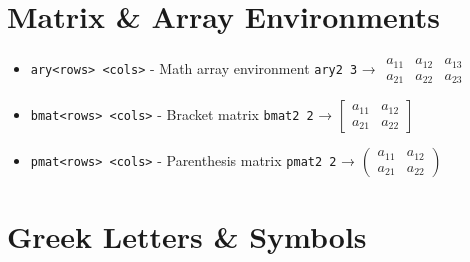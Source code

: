 \documentclass{article}
\newcommand{\snippet}[1]{\textcolor{titlebg}{\texttt{#1}}}
\newcommand{\example}[1]{\colorbox{codebg}{\texttt{#1}}}
\begin{document}
\section{Matrix \& Array Environments}

\begin{tcolorbox}[colback=purple!5!white,colframe=purple!75!black,title=Matrix Generators]
\begin{itemize}[leftmargin=*]
\item \snippet{ary<rows> <cols>} - Math array environment
\example{ary2 3} → 
\(\begin{array}{ccc}
a_{11} & a_{12} & a_{13} \\
a_{21} & a_{22} & a_{23}
\end{array}\)

\item \snippet{bmat<rows> <cols>} - Bracket matrix
\example{bmat2 2} → 
\(\begin{bmatrix}
a_{11} & a_{12} \\
a_{21} & a_{22}
\end{bmatrix}\)

\item \snippet{pmat<rows> <cols>} - Parenthesis matrix
\example{pmat2 2} → 
\(\begin{pmatrix}
a_{11} & a_{12} \\
a_{21} & a_{22}
\end{pmatrix}\)
\end{itemize}
\end{tcolorbox}

\section{Greek Letters \& Symbols}
\end{document}
